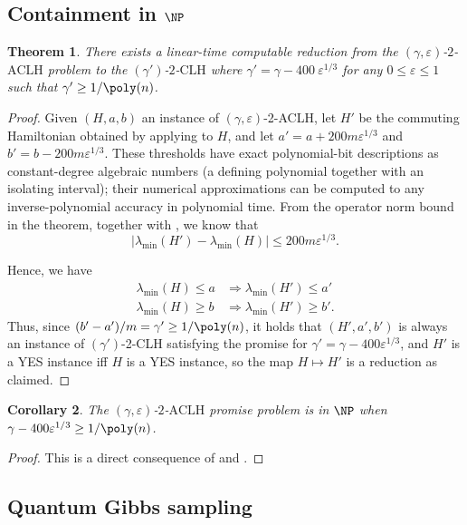 \documentclass[a4paper,onecolumn,11pt]{quantumarticle}
\theoremstyle{plain}
\newtheorem{theorem}{Theorem}[section]
\newtheorem{corollary}[theorem]{Corollary}
\newcommand{\eps}{\varepsilon}
\begin{document}
\subsection{Containment in $\NP$}
\begin{theorem}\label{thm:aclh-to-clh-reduction}
There exists a linear-time computable reduction from the $(\gamma, \eps)$-$2$-$\mathrm{ACLH}$ problem to the $(\gamma')$-$2$-$\mathrm{CLH}$ where $\gamma' = \gamma - 400\ \eps^{1/3}$ for any $0 \leq \eps \leq 1$ such that $\gamma'\geq 1/\poly(n)$.
\end{theorem}
\begin{proof}
Given $(H,a,b)$ an instance of $(\gamma,\eps)$-2-ACLH, let $H'$ be the commuting Hamiltonian obtained by applying  to $H$, and let $a' = a + 200m\eps^{1/3}$ and $b' = b - 200m\eps^{1/3}$. These thresholds have exact polynomial-bit descriptions as constant-degree algebraic numbers (a defining polynomial together with an isolating interval); their numerical approximations can be computed to any inverse-polynomial accuracy in polynomial time. From the operator norm bound in the theorem, together with , we know that \[|\lambda_{\min}(H') - \lambda_{\min}(H)| \leq 200 m \eps^{1/3}. \]

Hence, we have
\begin{align}
    \lambda_{\min}(H) \leq a &\Longrightarrow \lambda_{\min}(H') \leq a' \\
    \lambda_{\min}(H) \geq b &\Longrightarrow \lambda_{\min}(H') \geq b'.
\end{align}
Thus, since $(b'-a')/m=\gamma'\geq 1/\poly(n)$, it holds that $(H',a',b')$ is always an instance of $(\gamma')$-2-CLH satisfying the promise for $\gamma' = \gamma - 400\eps^{1/3}$, and $H'$ is a YES instance iff $H$ is a YES instance, so the map $H \mapsto H'$ is a reduction as claimed.
\end{proof}


\begin{corollary}
\label{corollary:NP-Containment}
    The $(\gamma, \eps)$-$2$-$\mathrm{ACLH}$ promise problem is in $\NP$ when $\gamma - 400\eps^{1/3} \geq 1/\poly(n)$.
\end{corollary}
\begin{proof}
This is a direct consequence of  and .
\end{proof}


\subsection{Quantum Gibbs sampling}\label{sec:Gibbs}
\end{document}
